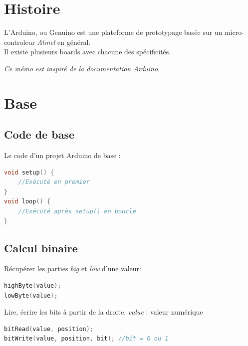 


    \section{Histoire}
        \bmar
            L'Arduino, ou Genuino est une plateforme de prototypage basée sur un micro-controleur \textit{Atmel} en général.\\
            Il existe plusieurs boards avec chacune des spécificités.

            \emph{Ce mémo est inspiré de la documentation Arduino.}
        \emar
    \section{Base}
        \subsection{Code de base}
            \bmar
                Le code d'un projet Arduino de base :
            \emar

        \begin{lstlisting}[language=C]
void setup() {
    //Exécuté en premier
}
void loop() {
    //Exécuté après setup() en boucle
}
        \end{lstlisting}


        \subsection{Calcul binaire}
            \bmar
                Récupérer les parties \textit{big} et \textit{low} d'une valeur:
            \emar

            \begin{lstlisting}[language=C]
highByte(value);
lowByte(value);
            \end{lstlisting}

            \bmar
                Lire, écrire les bits à partir de la droite, \textit{value} : valeur numérique
            \emar

            \begin{lstlisting}[language=C]
bitRead(value, position);
bitWrite(value, position, bit); //bit = 0 ou 1
            \end{lstlisting}

